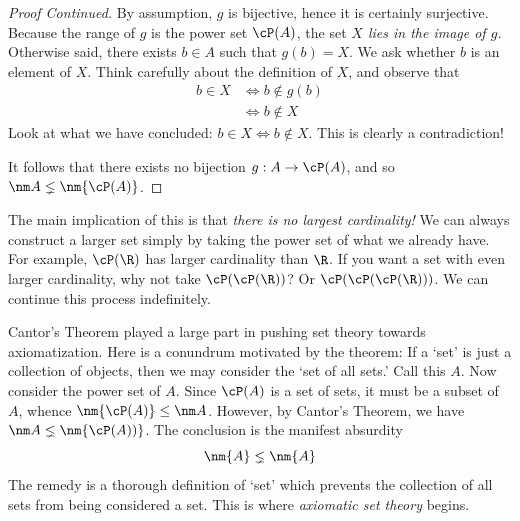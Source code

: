 \begin{proof}[Proof Continued]  
	By assumption, $g$ is bijective, hence it is certainly surjective. Because the range of $g$ is the power set $\cP(A)$, the set \emph{$X$ lies in the image of $g$.} Otherwise said, there exists $b\in A$ such that $g(b)=X$. We ask whether $b$ is an element of $X$. Think carefully about the definition of $X$, and observe that
	\begin{align*}
		b\in X&\iff b\not\in g(b)\tag*{(by the definition of $X$)}\\
		&\iff b\not\in X\tag*{(since $X=g(b)$)}
	\end{align*}
	Look at what we have concluded: $b\in X\iff b\not\in X$. This is clearly a contradiction!\par
	It follows that there exists no bijection $g:A\to\cP(A)$, and so $\nm A\lneq\nm{\cP(A)}$.
\end{proof}

The main implication of this is that \emph{there is no largest cardinality!} We can always construct a larger set simply by taking the power set of what we already have. For example, $\cP(\R)$ has larger cardinality than $\R$. If you want a set with even larger cardinality, why not take $\cP(\cP(\R))$? Or $\cP(\cP(\cP(\R)))$. We can continue this process indefinitely.

Cantor's Theorem played a large part in pushing set theory towards axiomatization. Here is a conundrum motivated by the theorem: If a `set' is just a collection of objects, then we may consider the `set of all sets.' Call this $A$. Now consider the power set of $A$. Since $\cP(A)$ is a set of sets, it must be a subset of $A$, whence $\nm{\cP(A)}\le\nm A$. However, by Cantor's Theorem, we have $\nm A\lneq\nm{\cP(A))}$. The conclusion is the manifest absurdity
\[
	\nm{A}\lneq\nm{A}
\]
The remedy is a thorough definition of `set' which prevents the collection of all sets from being considered a set. This is where \emph{axiomatic set theory} begins. 


